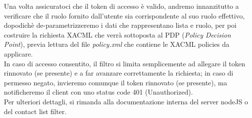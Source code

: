Una volta assicuratoci che il token di accesso è valido, andremo innanzitutto a verificare che il ruolo fornito dall'utente sia corrispondente al suo ruolo effettivo, dopodichè de-parametrizzeremo i dati che rappresentano lista e ruolo, per poi costruire la richiesta XACML che verrà sottoposta al PDP (\textit{Policy Decision Point}), previa lettura del file \textit{policy.xml} che contiene le XACML policies da applicare.\\
In caso di accesso consentito, il filtro si limita semplicemente ad allegare il token rinnovato (se presente) e a far avanzare correttamente la richiesta; in caso di permesso negato, invieremo comunque il token rinnovato (se presente), ma notificheremo il client con uno status code 401 (Unauthorized).\\

Per ulteriori dettagli, si rimanda alla documentazione interna del server nodeJS o del contact list filter.\\